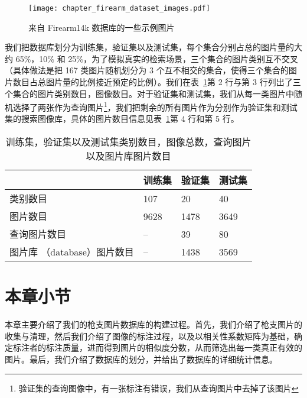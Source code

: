 \begin{figure}[t]
	\centering
	\texttt{[image: chapter\_firearm\_dataset\_images.pdf]}
	\caption{来自 Firearm14k 数据库的一些示例图片}
	\label{fig:dataset_sample_images}
\end{figure}

我们把数据库划分为训练集，验证集以及测试集，每个集合分别占总的图片量的大约 65\%，10\% 和 25\%，为了模拟真实的检索场景，三个集合的图片类别互不交叉 （具体做法是把 167 类图片随机划分为 3 个互不相交的集合，使得三个集合的图片数目占总图片量的比例接近预定的比例）。我们在表~\ref{table:train_val_test_stat}第 2 行与第 3 行列出了三个集合的图片类别数目，图像数目。对于验证集和测试集，我们从每一类图片中随机选择了两张作为查询图片\footnote{验证集的查询图像中，有一张标注有错误，我们从查询图片中去掉了该图片}，我们把剩余的所有图片作为分别作为验证集和测试集的搜索图像库，具体的图片数目信息见表~\ref{table:train_val_test_stat}第 4 行和第 5 行。

\begin{table}[!t]
	\centering
	\caption{训练集，验证集以及测试集类别数目，图像总数，查询图片以及图片库图片数目}
	\begin{tabular}{@{}llll@{}}
		\toprule
		          & 训练集 & 验证集 & 测试集 \\
		\midrule
		类别数目 & 107       & 20             & 40       \\
		图片数目 & 9628      & 1478           & 3649     \\
		查询图片数目 & --        & 39             & 80       \\
		图片库 （database）图片数目 & -- & 1438 &  3569 \\
		\bottomrule
	\end{tabular}

	\label{table:train_val_test_stat}
\end{table}

\section{本章小节}
本章主要介绍了我们的枪支图片数据库的构建过程。首先，我们介绍了枪支图片的收集与清理，然后我们介绍了图像的标注过程，以及以相关性系数矩阵为基础，确定标注者的标注质量，进而得到图片的相似度分数，从而筛选出每一类真正有效的图片。最后，我们介绍了数据库的划分，并给出了数据库的详细统计信息。
